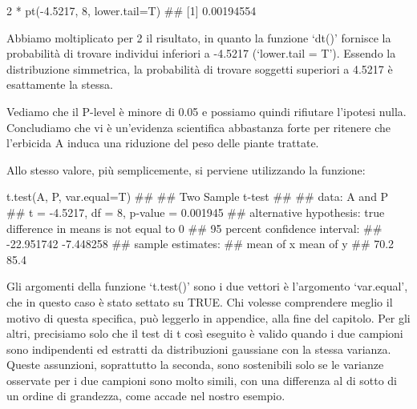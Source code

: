 \documentclass[a4paper,12pt,oneside]{book}
\newenvironment{Shaded}{}{}
\newcommand{\KeywordTok}[1]{#1}
\newcommand{\DataTypeTok}[1]{#1}
\newcommand{\DecValTok}[1]{#1}
\newcommand{\FloatTok}[1]{#1}
\newcommand{\StringTok}[1]{#1}
\newcommand{\CommentTok}[1]{#1}
\newcommand{\OperatorTok}[1]{#1}
\newcommand{\NormalTok}[1]{#1}
\begin{document}
\begin{Shaded}
\begin{Highlighting}[]
\DecValTok{2} \OperatorTok{*}\StringTok{ }\KeywordTok{pt}\NormalTok{(}\OperatorTok{-}\FloatTok{4.5217}\NormalTok{, }\DecValTok{8}\NormalTok{, }\DataTypeTok{lower.tail=}\NormalTok{T)}
\CommentTok{## [1] 0.00194554}
\end{Highlighting}
\end{Shaded}

Abbiamo moltiplicato per 2 il risultato, in quanto la funzione `dt()' fornisce la probabilità di trovare individui inferiori a -4.5217 (`lower.tail = T'). Essendo la distribuzione simmetrica, la probabilità di trovare soggetti superiori a 4.5217 è esattamente la stessa.

Vediamo che il P-level è minore di 0.05 e possiamo quindi rifiutare l'ipotesi nulla. Concludiamo che vi è un'evidenza scientifica abbastanza forte per ritenere che l'erbicida A induca una riduzione del peso delle piante trattate.

Allo stesso valore, più semplicemente, si perviene utilizzando la funzione:

\begin{Shaded}
\begin{Highlighting}[]
\KeywordTok{t.test}\NormalTok{(A, P, }\DataTypeTok{var.equal=}\NormalTok{T)}
\CommentTok{## }
\CommentTok{##  Two Sample t-test}
\CommentTok{## }
\CommentTok{## data:  A and P}
\CommentTok{## t = -4.5217, df = 8, p-value = 0.001945}
\CommentTok{## alternative hypothesis: true difference in means is not equal to 0}
\CommentTok{## 95 percent confidence interval:}
\CommentTok{##  -22.951742  -7.448258}
\CommentTok{## sample estimates:}
\CommentTok{## mean of x mean of y }
\CommentTok{##      70.2      85.4}
\end{Highlighting}
\end{Shaded}

Gli argomenti della funzione `t.test()' sono i due vettori è l'argomento `var.equal', che in questo caso è stato settato su TRUE. Chi volesse comprendere meglio il motivo di questa specifica, può leggerlo in appendice, alla fine del capitolo. Per gli altri, precisiamo solo che il test di t così eseguito è valido quando i due campioni sono indipendenti ed estratti da distribuzioni gaussiane con la stessa varianza. Queste assunzioni, soprattutto la seconda, sono sostenibili solo se le varianze osservate per i due campioni sono molto simili, con una differenza al di sotto di un ordine di grandezza, come accade nel nostro esempio.
\end{document}
